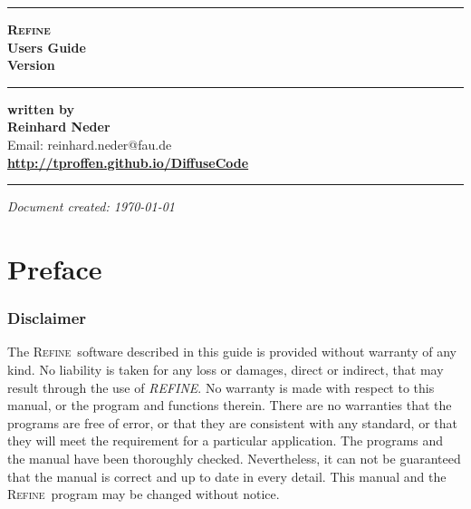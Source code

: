 \documentclass[11pt]{report}
\newcommand{\Refine}{\textsc{Refine\ }}
\newcommand{\refine}{\textsc{Refine}}
\begin{document}

\begin{titlepage}
\begin{flushright}

  \hrule
  \vspace{15mm}
  \textbf{{ \refine}} \\
  \vspace{15mm}
  \textbf{{ Users Guide}} \\
  \vspace{10mm}
  \textbf{{\Huge Version  \version}} \\
  \vspace{10mm}

  \hrule
  \vspace{45mm}
  \textbf{written by} \\

  \vspace{5mm}
  \textbf{\Large Reinhard Neder} \\
  Email: reinhard.neder@fau.de \\

  \vspace{20mm}
  \textbf{\Large \url{http://tproffen.github.io/DiffuseCode}} \\

  \vspace{3mm}
  \hrule

\end{flushright}
\begin{flushright}
  \textit{Document created: \today}
\end{flushright}

\end{titlepage}


\chapter*{Preface}
\subsection*{Disclaimer}

The \Refine software described in this guide is
provided without warranty of any kind.  No liability is taken for any loss
or damages, direct or indirect, that may result through the use of {\it
REFINE}.  No warranty is made with respect to this manual, or the program
and functions therein.  There are no warranties that the programs are free
of error, or that they are consistent with any standard, or that they will
meet the requirement for a particular application.  The programs and the
manual have been thoroughly checked.  Nevertheless, it can not be
guaranteed that the manual is correct and up to date in every detail. This
manual and the \Refine program may be changed without notice.\par
\end{document}
